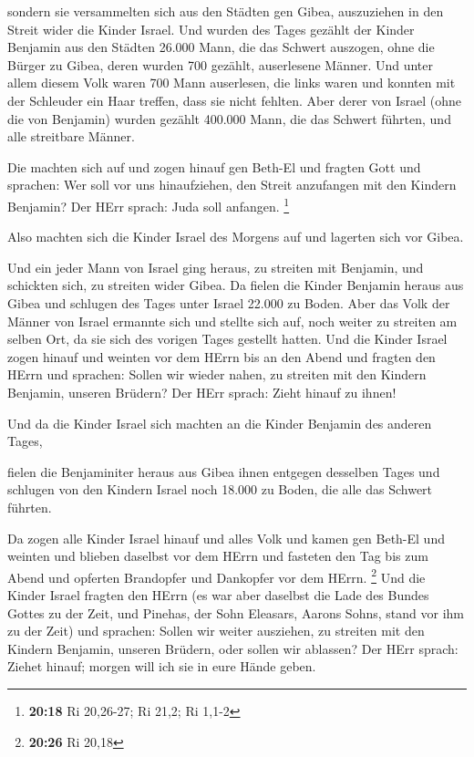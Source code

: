  sondern sie versammelten sich aus den Städten gen Gibea,
auszuziehen in den Streit wider die Kinder Israel.  Und
wurden des Tages gezählt der Kinder Benjamin aus den Städten 26.000
Mann, die das Schwert auszogen, ohne die Bürger zu Gibea, deren wurden
700 gezählt, auserlesene Männer.  Und unter allem diesem
Volk waren 700 Mann auserlesen, die links waren und konnten mit der
Schleuder ein Haar treffen, dass sie nicht fehlten.  Aber
derer von Israel (ohne die von Benjamin) wurden gezählt 400.000 Mann,
die das Schwert führten, und alle streitbare Männer.

 Die machten sich auf und zogen hinauf gen Beth-El und
fragten Gott und sprachen: Wer soll vor uns hinaufziehen, den Streit
anzufangen mit den Kindern Benjamin? Der HErr sprach: Juda soll
anfangen. \footnote{\textbf{20:18} Ri 20,26-27; Ri 21,2; Ri 1,1-2}

 Also machten sich die Kinder Israel des Morgens auf und
lagerten sich vor Gibea.

 Und ein jeder Mann von Israel ging heraus, zu streiten mit
Benjamin, und schickten sich, zu streiten wider Gibea.  Da
fielen die Kinder Benjamin heraus aus Gibea und schlugen des Tages unter
Israel 22.000 zu Boden.  Aber das Volk der Männer von
Israel ermannte sich und stellte sich auf, noch weiter zu streiten am
selben Ort, da sie sich des vorigen Tages gestellt hatten. 
Und die Kinder Israel zogen hinauf und weinten vor dem HErrn bis an den
Abend und fragten den HErrn und sprachen: Sollen wir wieder nahen, zu
streiten mit den Kindern Benjamin, unseren Brüdern? Der HErr sprach:
Zieht hinauf zu ihnen!

 Und da die Kinder Israel sich machten an die Kinder
Benjamin des anderen Tages,

 fielen die Benjaminiter heraus aus Gibea ihnen entgegen
desselben Tages und schlugen von den Kindern Israel noch 18.000 zu
Boden, die alle das Schwert führten.

 Da zogen alle Kinder Israel hinauf und alles Volk und
kamen gen Beth-El und weinten und blieben daselbst vor dem HErrn und
fasteten den Tag bis zum Abend und opferten Brandopfer und Dankopfer vor
dem HErrn. \footnote{\textbf{20:26} Ri 20,18}  Und die
Kinder Israel fragten den HErrn (es war aber daselbst die Lade des
Bundes Gottes zu der Zeit,  und Pinehas, der Sohn Eleasars,
Aarons Sohns, stand vor ihm zu der Zeit) und sprachen: Sollen wir weiter
ausziehen, zu streiten mit den Kindern Benjamin, unseren Brüdern, oder
sollen wir ablassen? Der HErr sprach: Ziehet hinauf; morgen will ich sie
in eure Hände geben.

